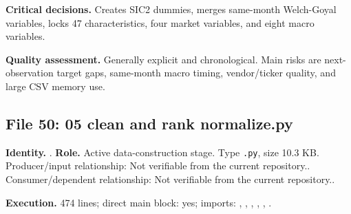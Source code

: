 \documentclass[
  11pt,
  a4paper]{article}
\begin{document}
\textbf{Critical decisions.} Creates SIC2 dummies, merges same-month
Welch-Goyal variables, locks 47 characteristics, four market variables,
and eight macro variables.

\textbf{Quality assessment.} Generally explicit and chronological. Main
risks are next-observation target gaps, same-month macro timing,
vendor/ticker quality, and large CSV memory use.

\subsection{File 50: 05 clean and rank
normalize.py}\label{file-3126660120052825760}

\textbf{Identity.} .
\textbf{Role.} Active data-construction stage. Type \texttt{.py}, size
10.3 KB. Producer/input relationship: Not verifiable from the current
repository.. Consumer/dependent relationship: Not verifiable from the
current repository..

\textbf{Execution.} 474 lines; direct main block: yes; imports:
, , ,
,
,
.
\end{document}
